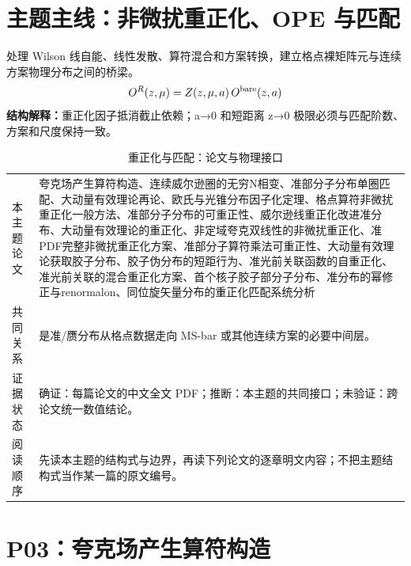 \documentclass[UTF8,11pt,oneside]{ctexbook}
\begin{document}
\chapter*{主题主线：非微扰重正化、OPE 与匹配}
处理 Wilson 线自能、线性发散、算符混合和方案转换，建立格点裸矩阵元与连续方案物理分布之间的桥梁。
\begin{equation}
  O^{R}(z,\mu)=Z(z,\mu,a)\,O^{\rm bare}(z,a)
\end{equation}
\noindent\textbf{结构解释：}重正化因子抵消截止依赖；a→0 和短距离 z→0 极限必须与匹配阶数、方案和尺度保持一致。
\begin{table}[htbp]
  \centering
  \caption{重正化与匹配：论文与物理接口}
  \small
  \begin{tabularx}{0.96\textwidth}{@{}p{3.3cm}>{\raggedright\arraybackslash}X@{}}
    \toprule
    本主题论文 & 夸克场产生算符构造、连续威尔逊圈的无穷N相变、准部分子分布单圈匹配、大动量有效理论再论、欧氏与光锥分布因子化定理、格点算符非微扰重正化一般方法、准部分子分布的可重正性、威尔逊线重正化改进准分布、大动量有效理论的重正化、非定域夸克双线性的非微扰重正化、准PDF完整非微扰重正化方案、准部分子算符乘法可重正性、大动量有效理论获取胶子分布、胶子伪分布的短距行为、准光前关联函数的自重正化、准光前关联的混合重正化方案、首个核子胶子部分子分布、准分布的幂修正与renormalon、同位旋矢量分布的重正化匹配系统分析 \\
    共同关系 & 是准/赝分布从格点数据走向 MS-bar 或其他连续方案的必要中间层。 \\
    证据状态 & 确证：每篇论文的中文全文 PDF；推断：本主题的共同接口；未验证：跨论文统一数值结论。 \\
    阅读顺序 & 先读本主题的结构式与边界，再读下列论文的逐章明文内容；不把主题结构式当作某一篇的原文编号。 \\
    \bottomrule
  \end{tabularx}
\end{table}

\chapter{P03：夸克场产生算符构造}
\end{document}
